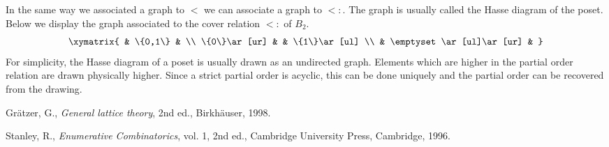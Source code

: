 \documentclass[12pt]{article}
\theoremstyle{definition}
\begin{document}
In the same way we associated a graph to $<$ we can associate a graph
to $<:$.  The graph is usually called the Hasse diagram of the poset.
Below we display the graph associated to the cover relation $<:$ of
$B_2$.
\[\xymatrix{
             & \{0,1\}                 &              \\
\{0\}\ar[ur] &                         & \{1\}\ar[ul] \\
             & \emptyset\ar[ul]\ar[ur] &              
}\]
For simplicity, the Hasse diagram of a poset is usually drawn as an
undirected graph.  Elements which are higher in the partial order
relation are drawn physically higher.  Since a strict partial order is
acyclic, this can be done uniquely and the partial order can be
recovered from the drawing.

\begin{thebibliography}{1}
Gr\"atzer, G., \emph{General lattice theory}, 2nd ed., Birkh\"auser, 1998.

Stanley, R., \emph{Enumerative Combinatorics}, vol. 1, 2nd ed., Cambridge
University Press, Cambridge, 1996.
\end{thebibliography}

\end{document}
